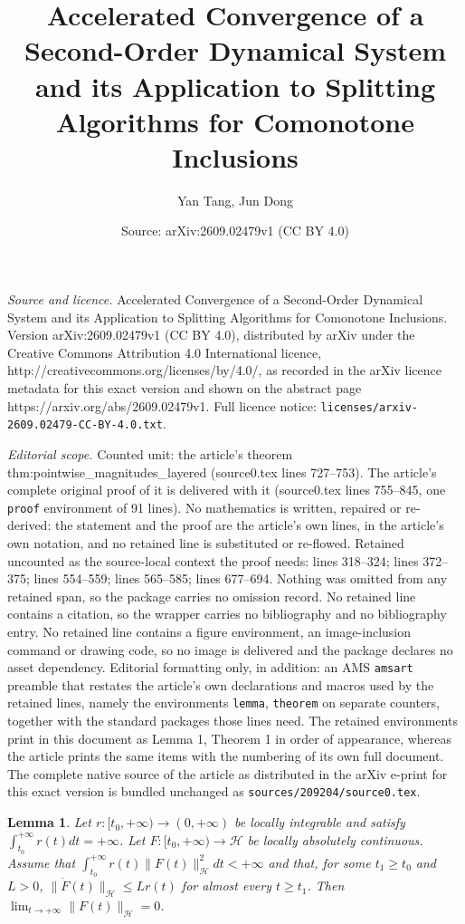 \documentclass[10pt,a4paper]{amsart}
\title{Accelerated Convergence of a Second-Order Dynamical System and its Application to Splitting Algorithms for Comonotone Inclusions}
\author{Yan Tang, Jun Dong}
\date{Source: arXiv:2609.02479v1 (CC BY 4.0)}
\newtheorem{lemma}{Lemma}
\begin{document}
\maketitle

\noindent\emph{Source and licence.} Accelerated Convergence of a Second-Order Dynamical System and its Application to Splitting Algorithms for Comonotone Inclusions. Version arXiv:2609.02479v1 (CC BY 4.0), distributed by arXiv under the Creative Commons Attribution 4.0 International licence, http://creativecommons.org/licenses/by/4.0/, as recorded in the arXiv licence metadata for this exact version and shown on the abstract page https://arxiv.org/abs/2609.02479v1. Full licence notice: \texttt{licenses/arxiv-2609.02479-CC-BY-4.0.txt}.\par\smallskip

\noindent\textit{Editorial scope.} Counted unit: the article's theorem thm:pointwise\_magnitudes\_layered (source0.tex lines 727--753). The article's complete original proof of it is delivered with it (source0.tex lines 755--845, one \texttt{proof} environment of 91 lines). No mathematics is written, repaired or re-derived: the statement and the proof are the article's own lines, in the article's own notation, and no retained line is substituted or re-flowed.  Retained uncounted as the source-local context the proof needs: lines 318--324; lines 372--375; lines 554--559; lines 565--585; lines 677--694.  Nothing was omitted from any retained span, so the package carries no omission record.  No retained line contains a citation, so the wrapper carries no bibliography and no bibliography entry.  No retained line contains a figure environment, an image-inclusion command or drawing code, so no image is delivered and the package declares no asset dependency.  Editorial formatting only, in addition: an AMS \texttt{amsart} preamble that restates the article's own declarations and macros used by the retained lines, namely the environments \texttt{lemma}, \texttt{theorem} on separate counters, together with the standard packages those lines need.  The retained environments print in this document as Lemma 1, Theorem 1 in order of appearance, whereas the article prints the same items with the numbering of its own full document.  The complete native source of the article as distributed in the arXiv e-print for this exact version is bundled unchanged as \texttt{sources/209204/source0.tex}.
\begin{lemma}
\label{lem:weighted_decay_criterion}
Let $r:[t_0,+\infty)\to(0,+\infty)$ be locally integrable and satisfy
$\int_{t_0}^{+\infty}r(t)dt=+\infty$. Let $F:[t_0,+\infty)\to\mathcal{H}$ be locally absolutely continuous. Assume that $\int_{t_0}^{+\infty} r(t)\|F(t)\|_{\mathcal{H}}^2dt<+\infty$ and that, for some $t_1\ge t_0$ and $L>0$, $\|\dot F(t)\|_{\mathcal{H}}\le Lr(t)$ 
for almost every $t\ge t_1$. Then
$\lim_{t\to+\infty}\|F(t)\|_{\mathcal{H}}=0$.
\end{lemma}
\end{document}

